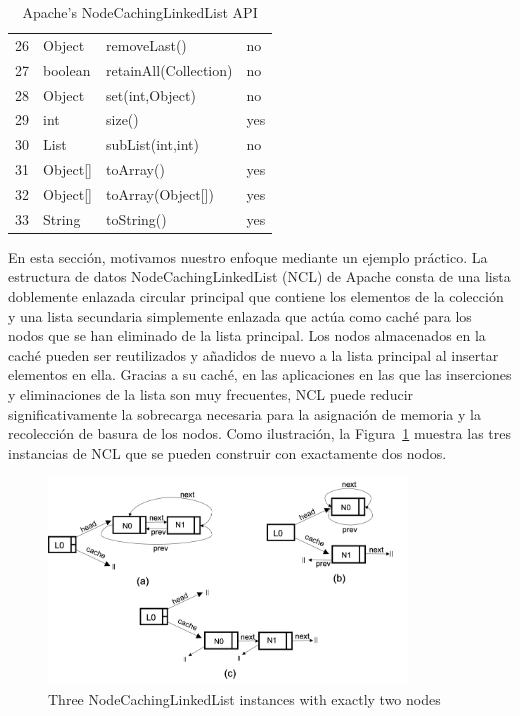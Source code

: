 \begin{table}[H]
{\begin{tabular}{|l|l|l|l|}
    26&Object&removeLast() &no\\
    27&boolean&retainAll(Collection) &no \\
    28&Object&set(int,Object) &no\\
    29&int&size() &yes\\
    30&List&subList(int,int) & no \\
    31&Object[]&toArray() & yes \\
    32&Object[]&toArray(Object[]) &yes\\
    33&String&toString() & yes \\
\hline
\end{tabular}
}
\caption{Apache's NodeCachingLinkedList API}
\label{tab:ncl-api}
\end{table} 
En esta sección, motivamos nuestro enfoque mediante un ejemplo práctico. La estructura de datos NodeCachingLinkedList (NCL) de Apache \cite{apache} consta de una lista doblemente enlazada circular principal que contiene los elementos de la colección y una lista secundaria simplemente enlazada que actúa como caché para los nodos que se han eliminado de la lista principal. Los nodos almacenados en la caché pueden ser reutilizados y añadidos de nuevo a la lista principal al insertar elementos en ella. Gracias a su caché, en las aplicaciones en las que las inserciones y eliminaciones de la lista son muy frecuentes, NCL puede reducir significativamente la sobrecarga necesaria para la asignación de memoria y la recolección de basura de los nodos. 
Como ilustración, la Figura~\ref{fig:ncl-instances} muestra las tres instancias de NCL que se pueden construir con exactamente dos nodos.
\\

\begin{figure}[H]
    \centering
    \includegraphics[width=0.85\textwidth]{NCL-instances.png}
    \caption{Three NodeCachingLinkedList instances with exactly two nodes}
    \label{fig:ncl-instances}
\end{figure}


